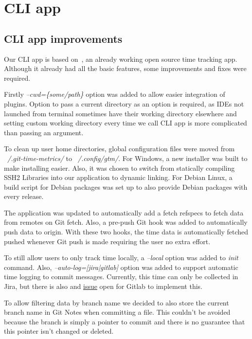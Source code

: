 \section{CLI app}\label{sec:cli-app-contents}

\subsection{CLI app improvements}\label{subsec:cli-app-improvements}
Our CLI app is based on~, an already working open source time tracking app.
Although it already had all the basic features, some improvements and fixes were required.

Firstly \textit{--cwd=\{some/path\}} option was added to allow easier integration of plugins.
Option to pass a current directory as an option is required, as IDEs not launched from terminal sometimes have their working
directory elsewhere and setting custom working directory every time we call CLI app is more complicated than passing an argument.

To clean up user home directories, global configuration files were moved from \textit{~/.git-time-metrics/} to \textit{~/.config/gtm/}.
For Windows, a new installer was built to make installing easier.
Also, it was chosen to switch from statically compiling SSH2 Libraries into our application to dynamic linking.
For Debian Linux, a build script for Debian packages was set up to also provide Debian packages with every release.

The application was updated to automatically add a fetch refspecs to fetch data from remotes on Git fetch.
Also, a pre-push Git hook was added to automatically push data to origin.
With these two hooks, the time data is automatically fetched pushed whenever Git push is made requiring the user no extra effort.

To still allow users to only track time locally, a \textit{--local} option was added to \textit{init} command.
Also, \textit{--auto-log=[jira|gitlab]} option was added to support automatic time logging to commit messages.
Currently, this time can only be collected in Jira, but there is also and \href{https://gitlab.com/gitlab-org/gitlab/-/issues/16543}{issue}
open for Gitlab to implement this.\cite{gitlab-time-issue}

To allow filtering data by branch name we decided to also store the current branch name in Git Notes when committing a file.
This couldn't be avoided because the branch is simply a pointer to commit and there is no guarantee that this pointer isn't changed or deleted.

